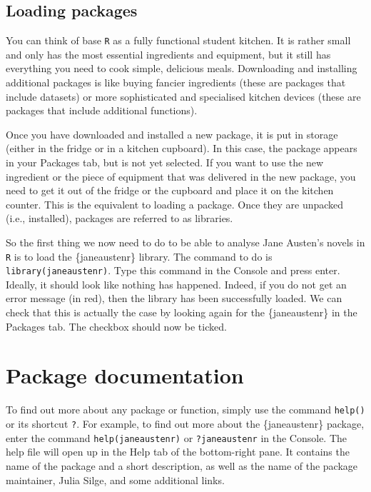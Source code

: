 \documentclass[
  letterpaper,
  DIV=11,
  numbers=noendperiod,
  oneside]{scrreprt}
\begin{document}
\subsection{Loading packages}\label{loading-packages}

You can think of base \texttt{R} as a fully functional student kitchen.
It is rather small and only has the most essential ingredients and
equipment, but it still has everything you need to cook simple,
delicious meals. Downloading and installing additional packages is like
buying fancier ingredients (these are packages that include datasets) or
more sophisticated and specialised kitchen devices (these are packages
that include additional functions).

Once you have downloaded and installed a new package, it is put in
storage (either in the fridge or in a kitchen cupboard). In this case,
the package appears in your Packages tab, but is not yet selected. If
you want to use the new ingredient or the piece of equipment that was
delivered in the new package, you need to get it out of the fridge or
the cupboard and place it on the kitchen counter. This is the equivalent
to loading a package. Once they are unpacked (i.e., installed), packages
are referred to as libraries.

So the first thing we now need to do to be able to analyse Jane Austen's
novels in \texttt{R} is to load the \{janeaustenr\} library. The command
to do is \texttt{library(janeaustenr)}. Type this command in the Console
and press enter. Ideally, it should look like nothing has happened.
Indeed, if you do not get an error message (in red), then the library
has been successfully loaded. We can check that this is actually the
case by looking again for the \{janeaustenr\} in the Packages tab. The
checkbox should now be ticked.

\section{Package documentation}\label{package-documentation}

To find out more about any package or function, simply use the command
\texttt{help()} or its shortcut \texttt{?}. For example, to find out
more about the \{janeaustenr\} package, enter the command
\texttt{help(janeaustenr)} or \texttt{?janeaustenr} in the Console. The
help file will open up in the Help tab of the bottom-right pane. It
contains the name of the package and a short description, as well as the
name of the package maintainer, Julia Silge, and some additional links.
\end{document}
